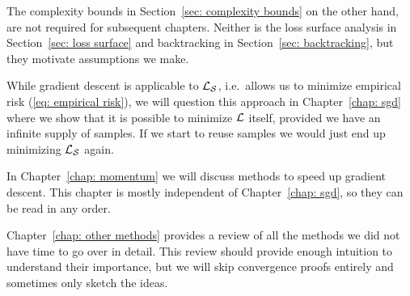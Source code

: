 The complexity bounds in Section~\ref{sec: complexity bounds} on the other hand,
are not required for subsequent chapters. Neither is the loss surface analysis
in Section~\ref{sec: loss surface} and backtracking in Section~\ref{sec:
backtracking}, but they motivate assumptions we make.

While gradient descent is applicable to \(\mathcal{L}_{\mathcal{S}}\), i.e.\ allows us
to minimize empirical risk (\ref{eq: empirical risk}), we will question this
approach in Chapter~\ref{chap: sgd} where we show that it is possible to
minimize \(\mathcal{L}\) itself, provided we have an infinite supply of samples. If we
start to reuse samples we would just end up minimizing \(\mathcal{L}_{\mathcal{S}}\) again.

In Chapter~\ref{chap: momentum} we will discuss methods to speed up
gradient descent. This chapter is mostly independent of Chapter~\ref{chap: sgd},
so they can be read in any order.

Chapter~\ref{chap: other methods} provides a review of all the methods we did
not have time to go over in detail. This review should provide enough intuition
to understand their importance, but we will skip convergence proofs entirely
and sometimes only sketch the ideas.



\endinput
